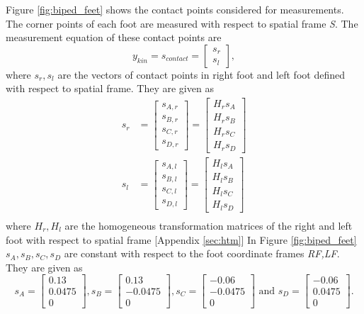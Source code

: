  Figure \ref{fig:biped_feet} shows the contact points considered for measurements. The corner points of each foot are measured with respect to spatial frame \emph{S}. The measurement equation of these contact points are
\begin{equation}
    \label{eq:y_kin}
    y_{kin} = s_{contact} = \begin{bmatrix}s_{r}\\ s_{l}\end{bmatrix},
\end{equation} where
$s_{r},s_{l}$ are the vectors of contact points in right foot and left foot defined with respect to spatial frame. They are given as
\begin{equation}
	\label{eq:y_cnt}
    \begin{split}
    s_{r} &= \begin{bmatrix} s_{A,r}\\ s_{B,r}\\ s_{C,r}\\ s_{D,r}\end{bmatrix}= \begin{bmatrix} {H}_{r}s_{A}\\  {H}_{r}s_{B}\\  {H}_{r}s_{C}\\  {H}_{r}s_{D}\end{bmatrix} \\
    s_{l} &= \begin{bmatrix} s_{A,l}\\ s_{B,l}\\ s_{C,l}\\ s_{D,l}\end{bmatrix}= \begin{bmatrix} {H}_{l}s_{A}\\  {H}_{l}s_{B}\\  {H}_{l}s_{C}\\  {H}_{l}s_{D}\end{bmatrix} \\
    \end{split}
\end{equation}
where ${H}_{r},{H}_{l}$ are the homogeneous transformation matrices of the right and left foot with respect to spatial frame [Appendix \ref{sec:htm}]
 In Figure \ref{fig:biped_feet} $s_A,s_B,s_C,s_D$ are constant with respect to the foot coordinate frames \emph{RF,LF}. They are given as 
 $$ s_A = \begin{bmatrix} 0.13 \\ 0.0475 \\ 0 \end{bmatrix} , 
    s_B = \begin{bmatrix} 0.13 \\ -0.0475 \\ 0 \end{bmatrix},
    s_C = \begin{bmatrix} -0.06 \\ -0.0475 \\ 0 \end{bmatrix} \text{ and }
    s_D = \begin{bmatrix} -0.06 \\ 0.0475 \\ 0 \end{bmatrix}.$$

